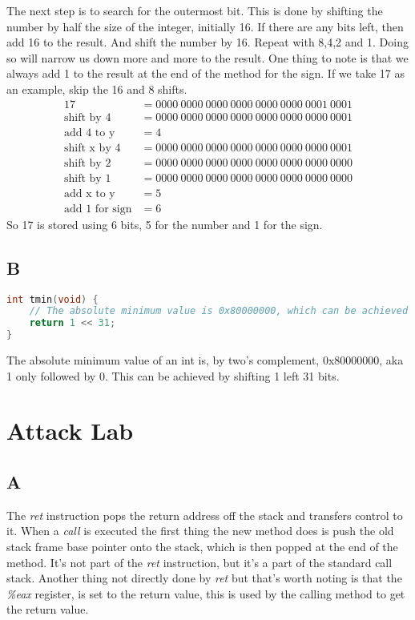 \documentclass[11pt]{report}
\begin{document}
The next step is to search for the outermost bit. This is done by shifting the number by half the size of the integer, initially 16. If there are any bits left, then add 16 to the result. And shift the number by 16. Repeat with 8,4,2 and 1. Doing so will narrow us down more and more to the result. One thing to note is that we always add 1 to the result at the end of the method for the sign. If we take 17 as an example, skip the 16 and 8 shifts. 
\begin{align*}
    17 &= 0000\ 0000\ 0000\ 0000\ 0000\ 0000\ 0001\ 0001\\
    \text{shift by 4} &= 0000\ 0000\ 0000\ 0000\ 0000\ 0000\ 0000\ 0001\\
    \text{add 4 to y} &= 4\\
    \text{shift x by 4} &= 0000\ 0000\ 0000\ 0000\ 0000\ 0000\ 0000\ 0001\\
    \text{shift by 2} &= 0000\ 0000\ 0000\ 0000\ 0000\ 0000\ 0000\ 0000\\
    \text{shift by 1} &= 0000\ 0000\ 0000\ 0000\ 0000\ 0000\ 0000\ 0000\\
    \text{add x to y} &= 5\\
    \text{add 1 for sign} &= 6
\end{align*}
So 17 is stored using 6 bits, 5 for the number and 1 for the sign.

\section{B}
\begin{lstlisting}[language=C]
int tmin(void) {
    // The absolute minimum value is 0x80000000, which can be achieved by shifting 1 left 31 bits.
    return 1 << 31;
}
\end{lstlisting}

The absolute minimum value of an int is, by two's complement, 0x80000000, aka 1 only followed by 0. This can be achieved by shifting 1 left 31 bits.


\chapter{Attack Lab}
\section{A}
The \textit{ret} instruction pops the return address off the stack and transfers control to it. When a \textit{call} is executed the first thing the new method does is push the old stack frame base pointer onto the stack, which is then popped at the end of the method. It's not part of the \textit{ret} instruction, but it's a part of the standard call stack. Another thing not directly done by \textit{ret} but that's worth noting is that the \textit{\%eax} register, is set to the return value, this is used by the calling method to get the return value.
\end{document}
